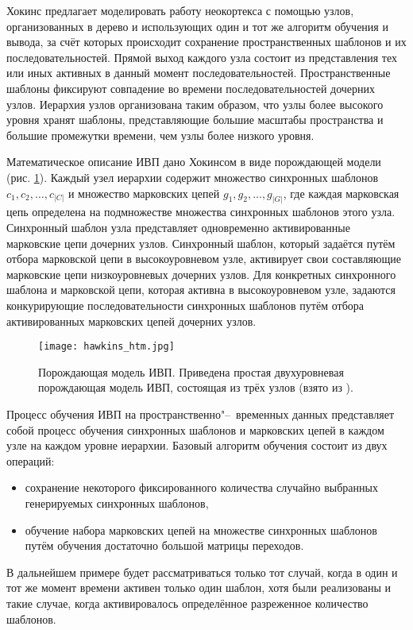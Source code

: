 Хокинс предлагает моделировать работу неокортекса с помощью узлов, организованных в дерево и использующих один и тот же алгоритм обучения и вывода, за счёт которых происходит сохранение пространственных шаблонов и их последовательностей. Прямой выход каждого узла состоит из представления тех или иных активных в данный момент последовательностей. Пространственные шаблоны фиксируют совпадение во времени последовательностей дочерних узлов. Иерархия узлов организована таким образом, что узлы более высокого уровня хранят шаблоны, представляющие большие масштабы пространства и большие промежутки времени, чем узлы более низкого уровня.

Математическое описание ИВП дано Хокинсом в виде порождающей модели (рис. \ref{fg:hawkins_htm}). Каждый узел иерархии содержит множество синхронных шаблонов $c_1, c_2,\dots,c_{|C|}$ и множество марковских цепей $g_1,g_2,\dots,g_{|G|}$, где каждая марковская цепь определена на подмножестве множества синхронных шаблонов этого узла. Синхронный шаблон узла представляет одновременно активированные марковские цепи дочерних узлов. Синхронный шаблон, который задаётся путём отбора марковской цепи в высокоуровневом узле, активирует свои составляющие марковские цепи низкоуровневых дочерних узлов. Для конкретных синхронного шаблона и марковской цепи, которая активна в высокоуровневом узле, задаются конкурирующие последовательности синхронных шаблонов путём отбора активированных марковских цепей дочерних узлов.

\begin{figure}[h]
	\centering
	\texttt{[image: hawkins\_htm.jpg]}
	\caption{Порождающая модель ИВП. Приведена простая двухуровневая порождающая модель ИВП, состоящая из трёх узлов (взято из \cite{Hawkins2009}).}
	\label{fg:hawkins_htm}
\end{figure}

Процесс обучения ИВП на пространственно"--~временных данных представляет собой процесс обучения синхронных шаблонов и марковских цепей в каждом узле на каждом уровне иерархии. Базовый алгоритм обучения состоит из двух операций:
\begin{itemize}
	\item сохранение некоторого фиксированного количества случайно выбранных генерируемых синхронных шаблонов,
	\item обучение набора марковских цепей на множестве синхронных шаблонов путём обучения достаточно большой матрицы переходов.
\end{itemize}
В дальнейшем примере будет рассматриваться только тот случай, когда в один и тот же момент времени активен только один шаблон, хотя были реализованы и такие случае, когда активировалось определённое разреженное количество шаблонов.

